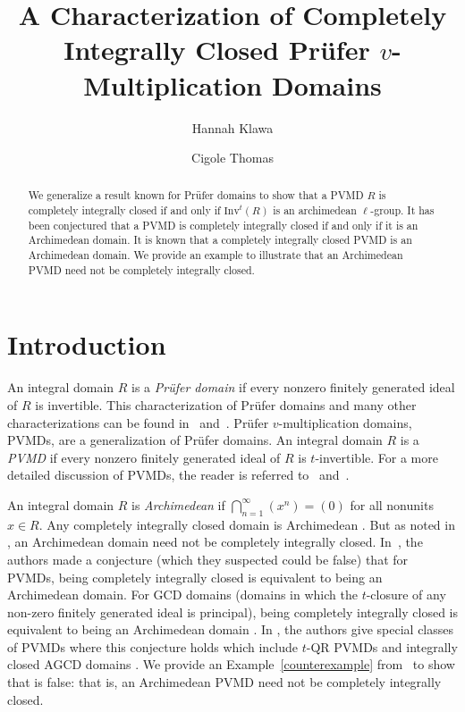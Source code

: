 \documentclass[12pt]{amsart}
\author{Hannah Klawa}
\author{Cigole Thomas}
\title[A Characterization of Completely Integrally Closed PVMDs]{A Characterization of Completely Integrally Closed Pr\"{u}fer $v$-Multiplication Domains}
\theoremstyle{definition}\newtheorem{remark}[theorem]{Remark}
\theoremstyle{definition}\newtheorem{definition}[theorem]{Definition}
\begin{document}
\begin{abstract} We generalize a result known for Pr\"ufer domains to show that a PVMD $R$ is completely integrally closed if and only if $\text{Inv}^t(R)$ is an archimedean $\ell$-group.
It has been conjectured that a PVMD is completely integrally closed if and only if it is an
Archimedean domain. It is known that a completely integrally closed PVMD is an Archimedean domain.  We provide an example to illustrate that an Archimedean PVMD need not be completely integrally closed. 
\end{abstract}

\maketitle
\section{Introduction}

An integral domain $R$ is a \textit{Pr\"{u}fer domain} if every nonzero finitely generated ideal of $R$ is invertible. This characterization of Pr\"{u}fer domains and many other characterizations can be found in~\cite{Prufer} and~\cite{Gilmer}. Pr\"{u}fer $v$-multiplication domains, PVMDs, are a generalization of Pr\"{u}fer domains. An integral domain $R$ is a \textit{PVMD} if every nonzero finitely generated ideal of $R$ is $t$-invertible. For a more detailed discussion of PVMDs, the reader is referred to~\cite{Mott1981} and~\cite{Elliott19}.


An integral domain $R$ is \textit{Archimedean} if $\bigcap\limits_{n=1}^\infty (x^n)=(0)$ for all nonunits $x\in R$. Any completely integrally closed domain is Archimedean \cite[Corollary 13.4]{Gilmer}. But as noted in \cite{Anderson2017}, an Archimedean domain need not be completely integrally closed. In~\cite[Conjecture 3.2]{Anderson2017}, the authors made a conjecture (which they suspected could be false) that for PVMDs, being completely integrally closed is equivalent to being an Archimedean domain. 
For GCD domains (domains in which the $t$-closure of any non-zero finitely generated ideal is principal), being completely integrally closed is equivalent to being an Archimedean domain \cite[Theorem 3.1]{Dobbs1976}. In \cite{Anderson2017}, the authors give special classes of PVMDs where this conjecture holds which include $t$-QR PVMDs and integrally closed AGCD domains \cite[Corollary 3.11 and Corollary 3.12]{Anderson2017}. We provide an Example~\ref{counterexample} from~\cite[Example 5.9]{Gabelli2020} to show that \cite[Conjecture 3.2]{Anderson2017} is false: that is, an Archimedean PVMD need not be completely integrally closed. 
\end{document}
